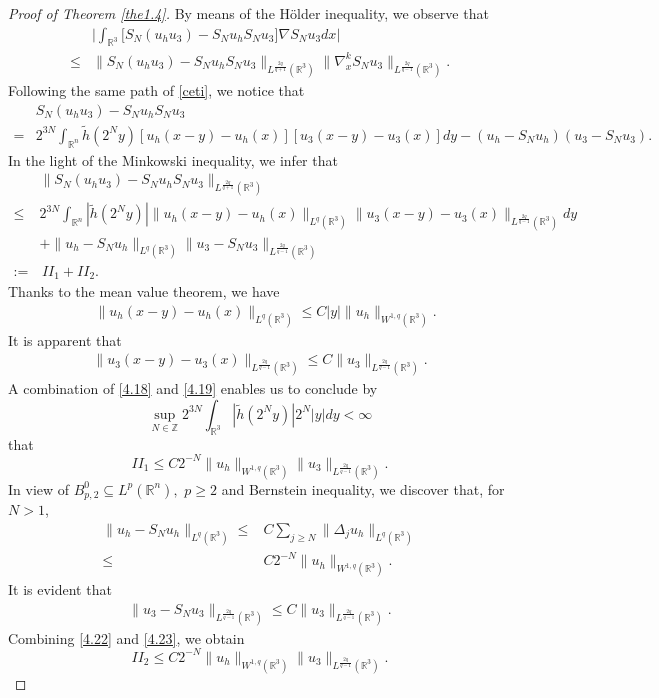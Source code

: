 \documentclass[11pt]{article}
\theoremstyle{plain}\newtheorem{definition}{Definition}[section]
\theoremstyle{definition}\newtheorem{theorem}{Theorem}[section]
\theoremstyle{plain}\newtheorem{lemma}[theorem]{Lemma}
\theoremstyle{plain}\newtheorem{coro}[theorem]{Corollary}
\theoremstyle{plain}\newtheorem{prop}[theorem]{Proposition}
\theoremstyle{remark}\newtheorem{remark}{Remark}[section]
\newcommand{\B}{\Big}
\newcommand{\be}{\begin{equation}}
\newcommand{\ee}{\end{equation}}
\newcommand{\ba}{\begin{aligned}}
\newcommand{\ea}{\end{aligned}}
\newcommand{\f}{\frac}
\numberwithin{equation}{section}
\begin{document}
\begin{proof}[Proof of Theorem \ref{the1.4}]
By means of the H\"older inequality, we observe that
\begin{equation}
\label{4.15}
	\begin{aligned}
	 &\B| \int_{\mathbb{R}^{3}}\big[S_{N}(u_{h}u_{3}) -S_{N}u_{h} S_{N}u_{3} \big]\nabla  S_{N}u_{3} dx \B|\\
\leq	& \|S_{N}(u_{h}u_{3})  -S_{N}u_{h}S_{N}u_{3}\|_{ L^{\f{2q}{q+1}} (\mathbb{R}^{3})}  \|\nabla^{k}_{x}S_{N}u_{3}\|_{ L^{\f{2q}{q-1}}  (\mathbb{R}^{3})}.
\end{aligned}\end{equation}
Following the same path of \eqref{ceti}, we notice that
\be\ba\label{4.16}
&S_{N}(u_{h}u_{3}) -S_{N}u_{h} S_{N}u_{3} \\
=&  2^{ 3N}\int_{\mathbb{R}^n}\tilde{h}(2^{N}y)[u_{h}(x-y)-u_{h}(x)]
[u_{3}(x-y)-u_{3}(x)]dy-(u_{h}-S_{N}u_{h})(u_{3}-S_{N}u_{3}).
\ea\ee
In the light  of  the Minkowski inequality, we infer that
$$\ba\label{4.17}
 &\|S_{N}(u_{h}u_{3})  -S_{N}u_{h}S_{N}u_{3}\|_{    L^{\f{2q}{q+1}}(\mathbb{R}^{3})}
 \\\leq& 2^{ 3N}\int_{\mathbb{R}^n}|\tilde{h}(2^{N}y)|\|u_{h}(x-y)-u_{h}(x) \|_{ L^{q}  (\mathbb{R}^{3})}
 \| u_{3}(x-y)-u_{3}(x) \|_{ L^{\f{2q}{q-1}} (\mathbb{R}^{3}) }dy
\\&+\| u_{h}-S_{N}u_{h} \|_{ L^{q}  (\mathbb{R}^{3})} \| u_{3}-S_{N}u_{3}\|_{L^{\f{2q}{q-1}} (\mathbb{R}^{3})}\\
:=&\,II_{1}+II_{2}.
\ea$$
Thanks to the
mean value theorem, we have
\be\ba\label{4.18}
&\|u_{h}(x-y)-u_{h}(x)\|_{ L^{q} (\mathbb{R}^{3})}\leq C |y| \|  u_{h}\|_{W^{1, q} (\mathbb{R}^{3})}.
\ea\ee
It is  apparent  that
\be\ba\label{4.19}
\| u_{3}(x-y)-u_{3}(x) \|_{ L^{\f{2q}{q-1}} (\mathbb{R}^{3}) }\leq C\| u_{3}  \|_{ L^{\f{2q}{q-1}} (\mathbb{R}^{3}) }.
\ea\ee
A combination of  \eqref{4.18} and
\eqref{4.19} enables us to conclude by
$$ \sup_{N\in\mathbb{Z}} 2^{ 3N}\int_{\mathbb{R}^3}  |\tilde{h}(2^{N}y)|  2^{N}|y| dy<\infty $$
that
\be\label{4.20}
II_{1}\leq C 2^{-   N}\|u_{h}\|_{W^{1, q} (\mathbb{R}^{3})} \| u_{3}  \|_{ L^{ \f{2q}{q-1}} (\mathbb{R}^{3})}.
\ee
In view of $B^{0}_{p,2}\subseteq L^{p}(\mathbb{R}^{n}),$ $ p\geq2$ and Bernstein inequality,
we discover that,  for $N>1$,
\be\ba\label{4.22}
\| u_{h}-{S}_{N}u_{h}\|_{ L^{q}  (\mathbb{R}^{3})}\leq& C    \sum_{j\geq N }\| \Delta_{j} u_{h} \|_{L^{q}(\mathbb{R}^{3})}
\\
\leq
&C 2^{- N} \| u_{h}\|_{W^{1,q} (\mathbb{R}^{3})}.
\ea\ee
It is   evident  that
 \be\ba\label{4.23}
\| u_{3}-{S}_{N} u_{3} \|_{ L^{\f{2q}{q-1}}  (\mathbb{R}^{3})}
\leq
 C \| u_{3}  \|_{ L^{\f{2q}{q-1}}  (\mathbb{R}^{3})}.
\ea\ee
Combining \eqref{4.22} and \eqref{4.23}, we obtain
\be\label{4.24}
II_{2}\leq C 2^{-   N}\|u_{h}\|_{W^{1, q} (\mathbb{R}^{3})} \| u_{3}  \|_{ L^{\f{2q}{q-1}} (\mathbb{R}^{3})}.\ee


\end{proof}
\end{document}
